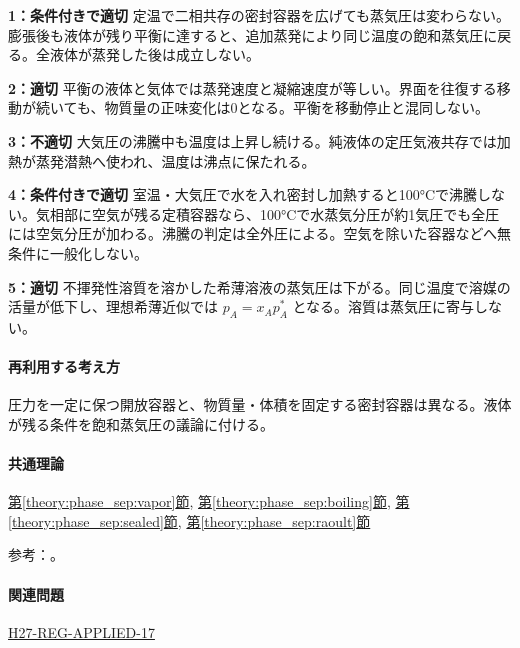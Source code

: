 \noindent\textbf{1：条件付きで適切} 定温で二相共存の密封容器を広げても蒸気圧は変わらない。膨張後も液体が残り平衡に達すると、追加蒸発により同じ温度の飽和蒸気圧に戻る。全液体が蒸発した後は成立しない。\par

\noindent\textbf{2：適切} 平衡の液体と気体では蒸発速度と凝縮速度が等しい。界面を往復する移動が続いても、物質量の正味変化は0となる。平衡を移動停止と混同しない。\par

\noindent\textbf{3：不適切} 大気圧の沸騰中も温度は上昇し続ける。純液体の定圧気液共存では加熱が蒸発潜熱へ使われ、温度は沸点に保たれる。\par

\noindent\textbf{4：条件付きで適切} 室温・大気圧で水を入れ密封し加熱すると100°Cで沸騰しない。気相部に空気が残る定積容器なら、100°Cで水蒸気分圧が約1気圧でも全圧には空気分圧が加わる。沸騰の判定は全外圧による。空気を除いた容器などへ無条件に一般化しない。\par

\noindent\textbf{5：適切} 不揮発性溶質を溶かした希薄溶液の蒸気圧は下がる。同じ温度で溶媒の活量が低下し、理想希薄近似では \(p_A=x_Ap_A^*\) となる。溶質は蒸気圧に寄与しない。\par

\paragraph{再利用する考え方} 圧力を一定に保つ開放容器と、物質量・体積を固定する密封容器は異なる。液体が残る条件を飽和蒸気圧の議論に付ける。

\paragraph{共通理論} \hyperref[theory:phase_sep:vapor]{第\ref*{theory:phase_sep:vapor}節}, \hyperref[theory:phase_sep:boiling]{第\ref*{theory:phase_sep:boiling}節}, \hyperref[theory:phase_sep:sealed]{第\ref*{theory:phase_sep:sealed}節}, \hyperref[theory:phase_sep:raoult]{第\ref*{theory:phase_sep:raoult}節}

\par 参考：\cite{mit_solutions2008,mit_clapeyron2008}。

\paragraph{関連問題} \hyperref[q:h27-reg-applied-17]{H27-REG-APPLIED-17}

